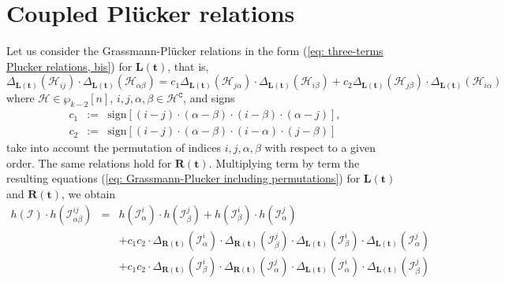 \documentclass[10pt]{article}
\theoremstyle{remark}%
\theoremstyle{definition}%
\begin{document}
\section{\label{sec: From Plucker to quartic relations} Coupled Pl\"{u}cker relations}
Let us consider the Grassmann-Pl\"{u}cker relations in the form (\ref{eq: three-terms Plucker relations, bis}) for $\mathbf{L}(\mathbf{t})$, that is, 
 \begin{equation}
\Delta_{\mathbf{L}(\mathbf{t})}(\mathcal{H}_{ij})\cdot\Delta_{\mathbf{L}(\mathbf{t})}(\mathcal{H}_{\alpha\beta})=c_{1}\Delta_{\mathbf{L}(\mathbf{t})}(\mathcal{H}_{j\alpha})\cdot\Delta_{\mathbf{L}(\mathbf{t})}(\mathcal{H}_{i\beta})+c_{2}\Delta_{\mathbf{L}(\mathbf{t})}(\mathcal{H}_{j\beta})\cdot\Delta_{\mathbf{L}(\mathbf{t})}(\mathcal{H}_{i\alpha})
\label{eq: Grassmann-Plucker including permutations}
 \end{equation}
where $\mathcal{H}\in\wp_{k-2}[n]$, $i,j,\alpha,\beta\in\mathcal{H}^{\mathtt{C}}$, and signs 
\begin{eqnarray}
c_{1} & := & \mathrm{sign}\left[(i-j)\cdot(\alpha-\beta)\cdot(i-\beta)\cdot(\alpha-j)\right],\nonumber \\
c_{2} & := & \mathrm{sign}\left[(i-j)\cdot(\alpha-\beta)\cdot(i-\alpha)\cdot(j-\beta)\right]\label{eq: signs for permutation}
\end{eqnarray}
take into account the permutation of indices $i,j,\alpha,\beta$ with respect to a given order. The same relations hold for $\mathbf{R}(\mathbf{t})$. Multiplying term by term the resulting equations (\ref{eq: Grassmann-Plucker including permutations}) for $\mathbf{L}(\mathbf{t})$ and $\mathbf{R}(\mathbf{t})$, we obtain
\begin{eqnarray} 
h(\mathcal{I})\cdot h(\mathcal{I}_{\alpha\beta}^{ij}) & = & h(\mathcal{I}_{\alpha}^{i})\cdot h(\mathcal{I}_{\beta}^{j})+h(\mathcal{I}_{\beta}^{i})\cdot h(\mathcal{I}_{\alpha}^{j})\nonumber \\
&  & +c_{1}c_{2}\cdot \Delta_{\mathbf{R}(\mathbf{t})}(\mathcal{I}_{\alpha}^{i})\cdot\Delta_{\mathbf{R}(\mathbf{t})}(\mathcal{I}_{\beta}^{j})\cdot\Delta_{\mathbf{L}(\mathbf{t})}(\mathcal{I}_{\beta}^{i})\cdot\Delta_{\mathbf{L}(\mathbf{t})}(\mathcal{I}_{\alpha}^{j})\nonumber \\
&  & +c_{1}c_{2}\cdot \Delta_{\mathbf{R}(\mathbf{t})}(\mathcal{I}_{\beta}^{i})\cdot\Delta_{\mathbf{R}(\mathbf{t})}(\mathcal{I}_{\alpha}^{j})\cdot\Delta_{\mathbf{L}(\mathbf{t})}(\mathcal{I}_{\alpha}^{i})\cdot\Delta_{\mathbf{L}(\mathbf{t})}(\mathcal{I}_{\beta}^{j})
\label{eq: quartic from Grassmann-Plucker}
\end{eqnarray}
\end{document}
